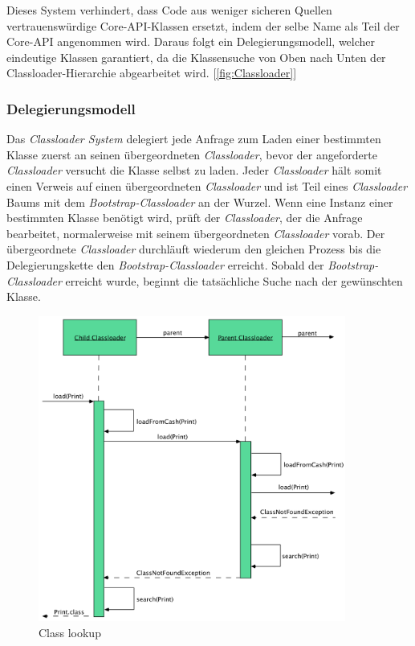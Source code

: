 \bigbreak
Dieses System verhindert, dass Code aus weniger sicheren Quellen vertrauenswürdige Core-API-Klassen ersetzt, indem der selbe Name als Teil der Core-API angenommen wird. Daraus folgt ein Delegierungsmodell, welcher eindeutige Klassen garantiert, da die Klassensuche von Oben nach Unten der Classloader-Hierarchie abgearbeitet wird. [\ref{fig:Classloader}] 
  
\subsubsection{Delegierungsmodell}
Das \textit{Classloader System} delegiert jede Anfrage zum Laden einer bestimmten Klasse zuerst an seinen übergeordneten \textit{Classloader}, bevor der angeforderte \textit{Classloader} versucht die Klasse selbst zu laden. 
Jeder \textit{Classloader} hält somit einen Verweis auf einen übergeordneten \textit{Classloader} und ist Teil eines \textit{Classloader} Baums mit dem \textit{Bootstrap-Classloader} an der Wurzel. Wenn eine Instanz einer bestimmten Klasse benötigt wird, prüft der \textit{Classloader}, der die Anfrage bearbeitet, normalerweise mit seinem übergeordneten \textit{Classloader} vorab. Der übergeordnete \textit{Classloader} durchläuft wiederum den gleichen Prozess bis die Delegierungskette den \textit{Bootstrap-Classloader} erreicht. Sobald der \textit{Bootstrap-Classloader} erreicht wurde, beginnt die tatsächliche Suche nach der gewünschten Klasse.
\begin{figure}[h]
  \centering
  \includegraphics[width=0.9\textwidth]{material/images/deligation.png}
  \caption{Class lookup}
  \label{fig:deligation}
\end{figure}
